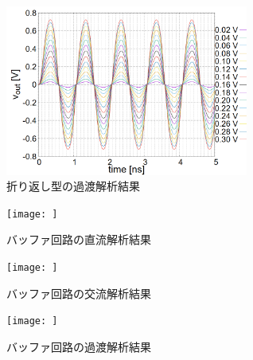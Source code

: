 \documentclass[twocolumn]{jsarticle}
\begin{document}
    \begin{figure}[H]
        \begin{center}
            \includegraphics*[width = 80mm]{figures/NtoN_tr.PNG}
            \caption{折り返し型の過渡解析結果}
            \label{fig:sim_NtoN_tr}
        \end{center}
    \end{figure}
    \begin{figure}[H]
        \begin{center}
            \texttt{[image: ]}
            \caption{バッファ回路の直流解析結果}
            \label{fig:sim_buf_dc}
        \end{center}
    \end{figure}
    \begin{figure}[H]
        \begin{center}
            \texttt{[image: ]}
            \caption{バッファ回路の交流解析結果}
            \label{fig:sim_buf_ac}
        \end{center}
    \end{figure}
    \begin{figure}[H]
        \begin{center}
            \texttt{[image: ]}
            \caption{バッファ回路の過渡解析結果}
            \label{fig:sim_buf_tr}
        \end{center}
    \end{figure}
\end{document}
